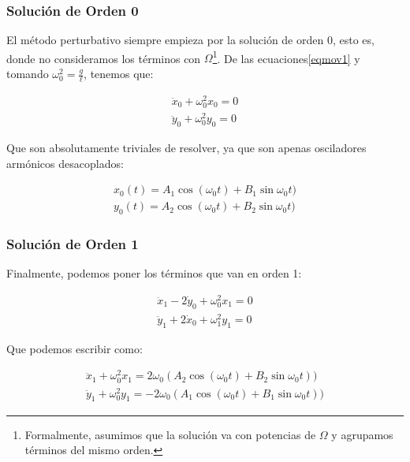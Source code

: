 \documentclass[a4paper,12pt]{article}
\begin{document}
\subsubsection*{Solución de Orden 0}
El método perturbativo siempre empieza por la solución de orden 0, esto es, donde no consideramos los términos con $\Omega$\footnote{Formalmente, asumimos que la solución va con potencias de $\Omega$ y agrupamos términos del mismo orden.}. De las ecuaciones\eqref{eqmov1} y tomando $\omega_{0}^2 = \frac{g}{\ell} $, tenemos que:

\begin{equation}
  \label{0th}
  \begin{aligned}
  \ddot{x}_0 + \omega_0^2 x_0 = 0\\
  \ddot{y}_0 + \omega_0^2 y_0 = 0
\end{aligned}
\end{equation}

Que son absolutamente triviales de resolver, ya que son apenas osciladores armónicos desacoplados:

\begin{equation}
\begin{aligned}
  x_0(t) = A_1 \cos(\omega_0 t) + B_1 \sin\omega_0 t)\\
  y_0(t) = A_2 \cos(\omega_0 t)  + B_2 \sin\omega_0 t)
\end{aligned}
\end{equation}

\subsubsection{Solución de Orden 1}
Finalmente, podemos poner los términos que van en orden 1:

\begin{equation*}
\begin{aligned}
  \ddot{x}_1 - 2 \dot{y}_0 + \omega_0^2 x_1 = 0\\
  \ddot{y}_1 + 2 \dot{x}_0 + \omega_1^2 y_1 = 0
\end{aligned}
\end{equation*}

Que podemos escribir como:

\begin{equation}
\begin{aligned}
  \ddot{x}_1 + \omega_0^2 x_1 = 2\omega_0(A_2 \cos(\omega_0 t)  + B_2 \sin\omega_0 t))\\
  \ddot{y}_1 + \omega_0^2 y_1 = -2\omega_0(A_1 \cos(\omega_0 t)  + B_1\sin\omega_0 t))
  \end{aligned}
\end{equation}
\end{document}
